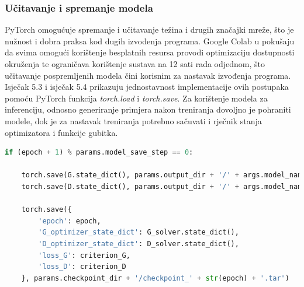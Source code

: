 \documentclass[times, utf8, diplomski]{fer}
\begin{document}
\subsubsection{Učitavanje i spremanje modela}

PyTorch omogućuje spremanje i učitavanje težina i drugih značajki mreže, što je nužnost i dobra praksa kod dugih izvođenja programa. Google Colab u pokušaju da svima omogući korištenje besplatnih resursa provodi optimizaciju dostupnosti okruženja te ograničava korištenje sustava na 12 sati rada odjednom, što učitavanje pospremljenih modela čini korisnim za nastavak izvođenja programa. Isječak 5.3 i isječak 5.4 prikazuju jednostavnost implementacije ovih postupaka pomoću PyTorch funkcija \textit{torch.load} i \textit{torch.save}. Za korištenje modela za inferenciju, odnosno generiranje primjera nakon treniranja dovoljno je pohraniti modele, dok je za nastavak treniranja potrebno sačuvati i rječnik stanja optimizatora i funkcije gubitka.


\begin{lstlisting}[language=Python, caption=Kod za spremanje kontrolnih točaka]
if (epoch + 1) % params.model_save_step == 0:

    torch.save(G.state_dict(), params.output_dir + '/' + args.model_name + '/' + 'G_' + str(epoch) + '.pth')
    torch.save(D.state_dict(), params.output_dir + '/' + args.model_name + '/' + 'D_' + str(epoch) + '.pth')

    torch.save({
        'epoch': epoch,
        'G_optimizer_state_dict': G_solver.state_dict(),
        'D_optimizer_state_dict': D_solver.state_dict(),
        'loss_G': criterion_G,
        'loss_D': criterion_D
    }, params.checkpoint_dir + '/checkpoint_' + str(epoch) + '.tar')

\end{lstlisting}

\break
\end{document}
